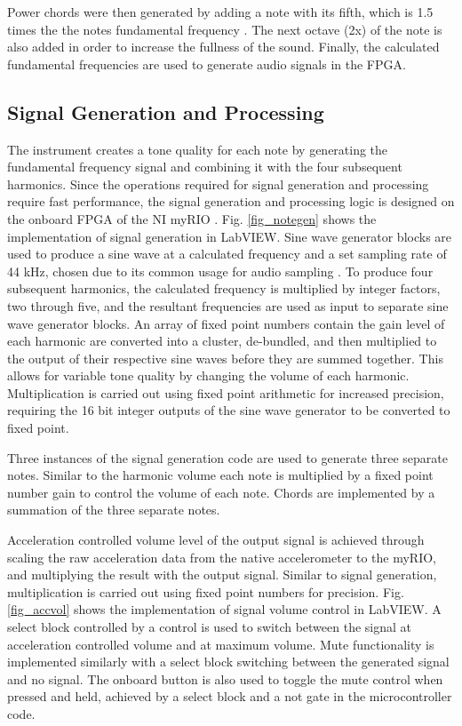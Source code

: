 Power chords were then generated by adding a note with its fifth, which is 1.5 times the the notes fundamental frequency \cite{power_chords}.
 The next octave (2x) of the note is also added in order to increase the fullness of the sound.
 Finally, the calculated fundamental frequencies are used to generate audio signals in the FPGA.

\subsection{Signal Generation and Processing}
The instrument creates a tone quality for each note by generating the fundamental frequency signal and combining it with the four subsequent harmonics.
 Since the operations required for signal generation and processing require fast performance, the signal generation and processing logic is designed on the onboard FPGA of the NI myRIO \cite{rt_comparison}.
 Fig. \ref{fig_notegen} shows the implementation of signal generation in LabVIEW.
 Sine wave generator blocks are used to produce a sine wave at a calculated frequency and a set sampling rate of 44 kHz, chosen due to its common usage for audio sampling \cite{sampling_rate}.
 To produce four subsequent harmonics, the calculated frequency is multiplied by integer factors, two through five, and the resultant frequencies are used as input to separate sine wave generator blocks.
 An array of fixed point numbers contain the gain level of each harmonic are converted into a cluster, de-bundled, and then multiplied to the output of their respective sine waves before they are summed together.
 This allows for variable tone quality by changing the volume of each harmonic.
 Multiplication is carried out using fixed point arithmetic for increased precision, requiring the 16 bit integer outputs of the sine wave generator to be converted to fixed point.

Three instances of the signal generation code are used to generate three separate notes. 
Similar to the harmonic volume each note is multiplied by a fixed point number gain to control the volume of each note. 
Chords are implemented by a summation of the three separate notes.

Acceleration controlled volume level of the output signal is achieved through scaling the raw acceleration data from the native accelerometer to the myRIO, and multiplying the result with the output signal. 
Similar to signal generation, multiplication is carried out using fixed point numbers for precision. 
 Fig. \ref{fig_accvol} shows the implementation of signal volume control in LabVIEW.
 A select block controlled by a control is used to switch between the signal at acceleration controlled volume and at maximum volume.
 Mute functionality is implemented similarly with a select block switching between the generated signal and no signal.
 The onboard button is also used to toggle the mute control when pressed and held, achieved by a select block and a not gate in the microcontroller code.


